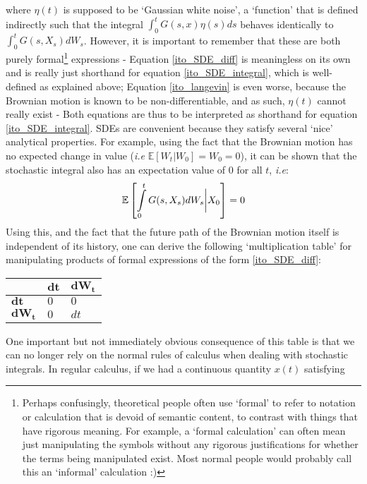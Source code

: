 where $\eta(t)$ is supposed to be `Gaussian white noise', a `function' that is defined indirectly such that the integral $\int_0^{t}G(s,x)\eta(s)ds$ behaves identically to $\int_0^{t}G(s,X_s)dW_s$. However, it is important to remember that these are both purely formal\footnote{Perhaps confusingly, theoretical people often use `formal' to refer to notation or calculation that is devoid of semantic content, to contrast with things that have rigorous meaning. For example, a `formal calculation' can often mean just manipulating the symbols without any rigorous justifications for whether the terms being manipulated exist. Most normal people would probably call this an `informal' calculation :)} expressions - Equation \eqref{ito_SDE_diff} is meaningless on its own and is really just shorthand for equation \eqref{ito_SDE_integral}, which is well-defined as explained above; Equation \eqref{ito_langevin} is even worse, because the Brownian motion is known to be non-differentiable, and as such, $\eta(t)$ cannot really exist - Both equations are thus to be interpreted as shorthand for equation \eqref{ito_SDE_integral}. SDEs are convenient because they satisfy several `nice' analytical properties. For example, using the fact that the Brownian motion has no expected change in value (\emph{i.e} $\mathbb{E}[W_t | W_0] = W_0 = 0$), it can be shown that the stochastic integral also has an expectation value of $0$ for all $t$, \emph{i.e}:
\begin{equation*}
\mathbb{E}\left[\int\limits_{0}^{t} G(s,X_s)dW_s \bigg{|} X_0\right] = 0
\end{equation*}
Using this, and the fact that the future path of the Brownian motion itself is independent of its history, one can derive the following `multiplication table' for manipulating products of formal expressions of the form \eqref{ito_SDE_diff}:
\begin{center}
	\begin{tabularx}{0.4\textwidth}{ 
			| >{\centering\arraybackslash}X 
			| >{\centering\arraybackslash}X 
			| >{\centering\arraybackslash}X | }
		\hline
		& $\mathbf{dt}$ & $\mathbf{dW_t}$ \\
		\hline
		$\mathbf{dt}$ & $0$  &  $0$ \\ 
		\hline
		$\mathbf{dW_t}$ & $0$  & $dt$ \\
		\hline
	\end{tabularx}
\end{center}
One important but not immediately obvious consequence of this table is that we can no longer rely on the normal rules of calculus when dealing with stochastic integrals. In regular calculus, if we had a continuous quantity $x(t)$ satisfying
